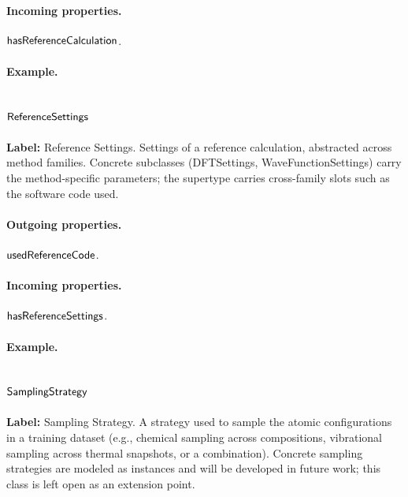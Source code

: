 \paragraph{Incoming properties.} $\mathsf{hasReferenceCalculation}$.

\paragraph{Example.}

\subsection{$\mathsf{ReferenceSettings}$}
\label{sec:term-ReferenceSettings}

\textbf{Label:} Reference Settings.
Settings of a reference calculation, abstracted across method families. Concrete subclasses (DFTSettings, WaveFunctionSettings) carry the method-specific parameters; the supertype carries cross-family slots such as the software code used.

\paragraph{Outgoing properties.} $\mathsf{usedReferenceCode}$.

\paragraph{Incoming properties.} $\mathsf{hasReferenceSettings}$.

\paragraph{Example.}

\subsection{$\mathsf{SamplingStrategy}$}
\label{sec:term-SamplingStrategy}

\textbf{Label:} Sampling Strategy.
A strategy used to sample the atomic configurations in a training dataset (e.g., chemical sampling across compositions, vibrational sampling across thermal snapshots, or a combination). Concrete sampling strategies are modeled as instances and will be developed in future work; this class is left open as an extension point.

